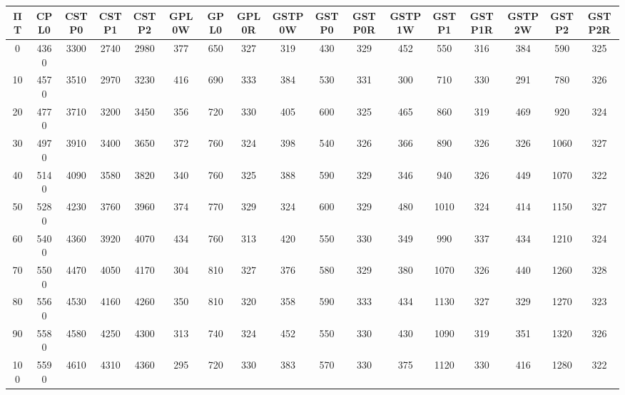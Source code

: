 \begin{tabular}{|c|c|c|c|c|c|c|c|c|c|c|c|c|c|c|c|c|}
\hline
ΠΤ&CPL0&CSTP0&CSTP1&CSTP2&GPL0W&GPL0&GPL0R&GSTP0W&GSTP0&GSTP0R&GSTP1W&GSTP1&GSTP1R&GSTP2W&GSTP2&GSTP2R\\\hline
\hline
0&4360&3300&2740&2980&377&650&327&319&430&329&452&550&316&384&590&325\\
\hline
10&4570&3510&2970&3230&416&690&333&384&530&331&300&710&330&291&780&326\\
\hline
20&4770&3710&3200&3450&356&720&330&405&600&325&465&860&319&469&920&324\\
\hline
30&4970&3910&3400&3650&372&760&324&398&540&326&366&890&326&326&1060&327\\
\hline
40&5140&4090&3580&3820&340&760&325&388&590&329&346&940&326&449&1070&322\\
\hline
50&5280&4230&3760&3960&374&770&329&324&600&329&480&1010&324&414&1150&327\\
\hline
60&5400&4360&3920&4070&434&760&313&420&550&330&349&990&337&434&1210&324\\
\hline
70&5500&4470&4050&4170&304&810&327&376&580&329&380&1070&326&440&1260&328\\
\hline
80&5560&4530&4160&4260&350&810&320&358&590&333&434&1130&327&329&1270&323\\
\hline
90&5580&4580&4250&4300&313&740&324&452&550&330&430&1090&319&351&1320&326\\
\hline
100&5590&4610&4310&4360&295&720&330&383&570&330&375&1120&330&416&1280&322\\
\hline
\end{tabular}
